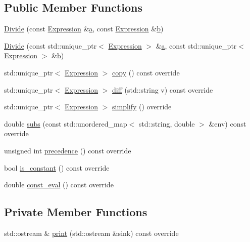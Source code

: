 \subsection*{Public Member Functions}
\begin{DoxyCompactItemize}
\item 
\hyperlink{classsymcpp_1_1Divide_a1399cc15ca3af6ed217c20cadb2694ad}{Divide} (const \hyperlink{classsymcpp_1_1Expression}{Expression} \&\hyperlink{classsymcpp_1_1Divide_a52eaf8a705da4ef10b1fa2b87e76d0d8}{a}, const \hyperlink{classsymcpp_1_1Expression}{Expression} \&\hyperlink{classsymcpp_1_1Divide_a122c034c19635c036d39fbf18b1b8348}{b})
\item 
\hyperlink{classsymcpp_1_1Divide_a010b104132d0341805ca34277422d867}{Divide} (const std\+::unique\+\_\+ptr$<$ \hyperlink{classsymcpp_1_1Expression}{Expression} $>$ \&\hyperlink{classsymcpp_1_1Divide_a52eaf8a705da4ef10b1fa2b87e76d0d8}{a}, const std\+::unique\+\_\+ptr$<$ \hyperlink{classsymcpp_1_1Expression}{Expression} $>$ \&\hyperlink{classsymcpp_1_1Divide_a122c034c19635c036d39fbf18b1b8348}{b})
\item 
std\+::unique\+\_\+ptr$<$ \hyperlink{classsymcpp_1_1Expression}{Expression} $>$ \hyperlink{classsymcpp_1_1Divide_a6e4eeef806e8bded246e87d0036effee}{copy} () const override
\item 
std\+::unique\+\_\+ptr$<$ \hyperlink{classsymcpp_1_1Expression}{Expression} $>$ \hyperlink{classsymcpp_1_1Divide_aeecc60e1759b81ea65b0b95a62ff38df}{diff} (std\+::string v) const override
\item 
std\+::unique\+\_\+ptr$<$ \hyperlink{classsymcpp_1_1Expression}{Expression} $>$ \hyperlink{classsymcpp_1_1Divide_ab0e372a337f207a3e4c78fd1db9351a7}{simplify} () override
\item 
double \hyperlink{classsymcpp_1_1Divide_a85dcd571e1d2a188dcdc8090b7e90074}{subs} (const std\+::unordered\+\_\+map$<$ std\+::string, double $>$ \&env) const override
\item 
unsigned int \hyperlink{classsymcpp_1_1Divide_a016fec0e409cff8d0cd2b53eea1fa6c3}{precedence} () const override
\item 
bool \hyperlink{classsymcpp_1_1Divide_a342ddc6fb6f80a37797bda030b4c7580}{is\+\_\+constant} () const override
\item 
double \hyperlink{classsymcpp_1_1Divide_a18ab0e9eddd473ee5400607b9e6ea2b0}{const\+\_\+eval} () const override
\end{DoxyCompactItemize}
\subsection*{Private Member Functions}
\begin{DoxyCompactItemize}
\item 
std\+::ostream \& \hyperlink{classsymcpp_1_1Divide_a113a96148c27f2d50a596c782f9a4005}{print} (std\+::ostream \&sink) const override
\end{DoxyCompactItemize}
